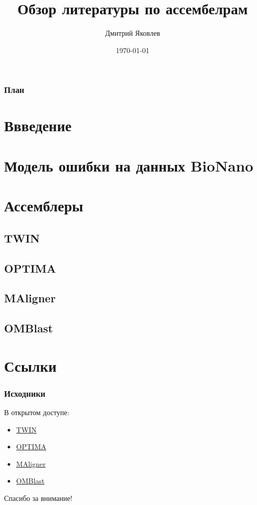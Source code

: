 \documentclass{beamer}
\title[Обзор литературы по ассембелрам]{Обзор литературы по ассембелрам}
\author{Дмитрий Яковлев}
\institute{EPAM Systems}
\date{\today}
\begin{document}
\graphicspath{{./img/}}

\begin{frame}
  \titlepage
\end{frame}

\begin{frame}
\frametitle{План}
\tableofcontents
\end{frame}

\section{Ввведение}


\section{Модель ошибки на данных BioNano}


\section{Ассемблеры}

\subsection{TWIN}


\subsection{OPTIMA}


\subsection{MAligner}


\subsection{OMBlast}


\section{Ссылки}
\begin{frame}
\frametitle{Исходники}
В открытом доступе:
\begin{itemize}
  \item \href{http://www.cs.colostate.edu/twin/download.html}{TWIN}
  \item \href{https://github.com/verznet/OPTIMA}{OPTIMA}
  \item \href{https://github.com/LeeMendelowitz/maligner}{MAligner}
  \item \href{https://github.com/aldenleung/OMBlast}{OMBlast}
\end{itemize}
\end{frame}

\begin{frame}

\begin{center}
\Huge Спасибо за внимание!
\end{center}

\end{frame}
\end{document}
